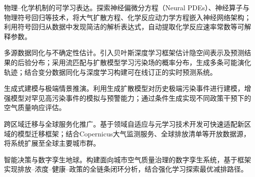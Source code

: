 物理--化学机制的可学习表达。探索神经偏微分方程（Neural PDEs）、神经算子与物理符号回归等技术，将大气扩散方程、化学反应动力学方程嵌入神经网络架构；利用符号回归从数据中发现简洁的解析表达式，自动提取化学反应速率常数等可解释参数。

多源数据同化与不确定性估计。引入贝叶斯深度学习框架估计隐空间表示及预测结果的后验分布；采用流匹配与扩散模型学习污染场的概率分布，生成多条可能演化轨迹；结合变分数据同化与深度学习构建可在线订正的实时预测系统。

生成式建模与极端情景推演。利用生成扩散模型对历史极端污染事件进行建模，增强模型对罕见高污染事件的模拟与预警能力；通过条件生成实现不同政策干预下的空气质量响应评估。

跨区域迁移与全球服务化推广。基于领域自适应与元学习技术开发可快速适配新区域的模型迁移框架；结合Copernicus大气监测服务、全球排放清单等开放数据源，将系统扩展至全球主要城市群。

智能决策与数字孪生地球。构建面向城市空气质量治理的数字孪生系统，基于框架实现排放--浓度--健康--政策的全链条闭环分析，结合强化学习探索最优减排路径。